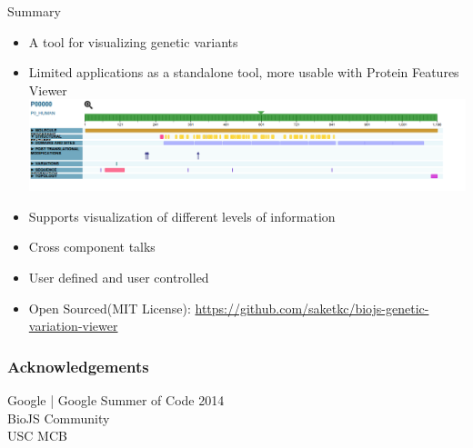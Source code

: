 \documentclass[10pt, compress]{beamer}
\renewcommand{\(}{\begin{columns}}
\renewcommand{\)}{\end{columns}}
\newcommand{\<}[1]{\begin{column}{#1}}
\renewcommand{\>}{\end{column}}
\begin{document}
\begin{frame}{Summary}
\begin{itemize}
\item A tool for visualizing genetic variants
\item Limited applications as a standalone tool, more usable with Protein Features Viewer 
\includegraphics[width=\linewidth]{images/fv}
\item Supports visualization of different levels of information
\item Cross component talks
\item User defined and user controlled
\item Open Sourced(MIT License): \url{https://github.com/saketkc/biojs-genetic-variation-viewer}

\end{itemize}

\end{frame}

\begin{frame}
\frametitle{Acknowledgements}
Google | Google Summer of Code 2014\\
BioJS Community \\
USC MCB
\end{frame}

\end{document}
